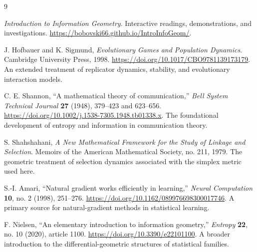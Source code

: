 \documentclass[11pt,oneside,openany]{book}
\theoremstyle{definition}
\theoremstyle{remark}
\numberwithin{equation}{chapter}
\begin{document}
\renewcommand{\bibname}{References and Further Reading}
\begin{thebibliography}{9}
\emph{Introduction to Information Geometry}. Interactive readings, demonstrations, and investigations.
\url{https://bobovski66.github.io/IntroInfoGeom/}.

J. Hofbauer and K. Sigmund, \emph{Evolutionary Games and Population Dynamics}. Cambridge University Press, 1998.
\url{https://doi.org/10.1017/CBO9781139173179}.
An extended treatment of replicator dynamics, stability, and evolutionary interaction models.

C. E. Shannon, ``A mathematical theory of communication,'' \emph{Bell System Technical Journal} \textbf{27} (1948), 379--423 and 623--656.
\url{https://doi.org/10.1002/j.1538-7305.1948.tb01338.x}.
The foundational development of entropy and information in communication theory.

S. Shahshahani, \emph{A New Mathematical Framework for the Study of Linkage and Selection}. Memoirs of the American Mathematical Society, no. 211, 1979.
The geometric treatment of selection dynamics associated with the simplex metric used here.

S.-I. Amari, ``Natural gradient works efficiently in learning,'' \emph{Neural Computation} \textbf{10}, no. 2 (1998), 251--276.
\url{https://doi.org/10.1162/089976698300017746}.
A primary source for natural-gradient methods in statistical learning.

F. Nielsen, ``An elementary introduction to information geometry,'' \emph{Entropy} \textbf{22}, no. 10 (2020), article 1100.
\url{https://doi.org/10.3390/e22101100}.
A broader introduction to the differential-geometric structures of statistical families.
\end{thebibliography}

\cleardoublepage{}\printindex
\end{document}
